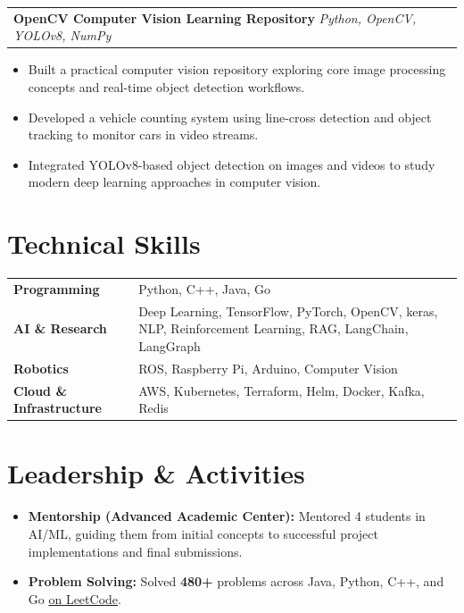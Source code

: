 \documentclass[a4paper,11pt]{article}
\makeatletter
\newcommand{\GitHubIcon}{\faGithub}
\newcommand{\GitHubIcon}{\textbf{GH}}
\newcommand{\cventry}[5][]{%
  \begin{samepage}
  \begin{tabularx}{\linewidth}{@{}X r@{}}
    \textbf{#2} \textit{\small\color{lightgray}#3} & \small\color{lightgray}#4 \ifthenelse{\equal{#1}{}}{}{\hspace{0.3em}\textcolor{accent}{#1}} \\
  \end{tabularx}%
  \vspace{1pt}
  \begin{itemize}[nosep, leftmargin=1.2em, itemsep=2pt, topsep=1pt, label={\small\textbullet}]
    #5
  \end{itemize}
  \vspace{4pt}
  \end{samepage}
}
\newcommand{\skillrow}[2]{%
  \textbf{#1} & \small #2 \\[2pt]
}
\makeatother
\begin{document}
\cventry[\href{https://github.com/KoteshwarChinnolla/open-cv}{\GitHubIcon}]{OpenCV Computer Vision Learning Repository}{\normalfont\small Python, OpenCV, YOLOv8, NumPy}{}{\item Built a practical computer vision repository exploring core image processing concepts and real-time object detection workflows.
  \item Developed a vehicle counting system using line-cross detection and object tracking to monitor cars in video streams.
  \item Integrated YOLOv8-based object detection on images and videos to study modern deep learning approaches in computer vision.
}

\section{Technical Skills}

\begin{tabularx}{\linewidth}{@{}l X@{}}
  \skillrow{Programming}{Python, C++, Java, Go}
  \skillrow{AI \& Research}{Deep Learning, TensorFlow, PyTorch, OpenCV, keras, NLP, Reinforcement Learning, RAG, LangChain, LangGraph}
  \skillrow{Robotics}{ROS, Raspberry Pi, Arduino, Computer Vision}
  \skillrow{Cloud \& Infrastructure}{AWS, Kubernetes, Terraform, Helm, Docker, Kafka, Redis}
\end{tabularx}

\section{Leadership \& Activities}
\begin{itemize}[nosep, leftmargin=1em, itemsep=4pt, label=\textbullet]
  \item \textbf{Mentorship (Advanced Academic Center):} Mentored 4 students in AI/ML, guiding them from initial concepts to successful project implementations and final submissions.
  \item \textbf{Problem Solving:} Solved \textbf{480+} problems across Java, Python, C++, and Go \textcolor{accent}{\href{https://leetcode.com/u/chinnollakoteshwar/}{on LeetCode}}.
\end{itemize}
\end{document}
